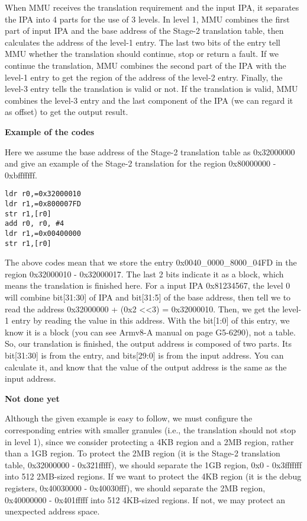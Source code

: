 When MMU receives the translation requirement and the input IPA, it separates the IPA into 4 parts for the use of 3 levels.
In level 1, MMU combines the first part of input IPA and the base address of the Stage-2 translation table, then calculates the address of the level-1 entry.
The last two bits of the entry tell MMU whether the translation should continue, stop or return a fault.
If we continue the translation, MMU combines the second part of the IPA with the level-1 entry to get the region of the address of the level-2 entry. Finally, the level-3 entry tells the translation is valid or not. If the translation is valid, MMU combines the level-3 entry and the last component of the IPA (we can regard it as offset) to get the output result. 

\vspace{10pt}
\textbf{Example of the codes}
\vspace{10pt}

Here we assume the base address of the Stage-2 translation table as 0x32000000 and give an example of the Stage-2 translation for the region 0x80000000 - 0xbfffffff.

\begin{lstlisting}
ldr r0,=0x32000010
ldr r1,=0x800007FD
str r1,[r0]
add r0,	r0,	#4
ldr r1,=0x00400000
str r1,[r0]
\end{lstlisting}

The above codes mean that we store the entry 0x0040\_0000\_8000\_04FD in the region 0x32000010 - 0x32000017.
The last 2 bits indicate it as a block, which means the translation is finished here.
For a input IPA 0x81234567, the level 0 will combine 
bit[31:30] of IPA and bit[31:5] of the base address, then tell we to read the address 0x32000000 + (0x2 \textless \textless 3) = 0x32000010. Then, we get the level-1 entry by reading the value in this address.
With the bit[1:0] of this entry, we know it is a block (you can see Armv8-A manual on page G5-6290), not a table. So, our translation is finished, the output address is composed of two parts. Its bit[31:30] is from the entry, and bits[29:0] is from the input address. You can calculate it, and know that the value of the output address is the same as the input address.

\vspace{10pt}
\textbf{Not done yet}
\vspace{10pt}

Although the given example is easy to follow, we must configure the corresponding entries with smaller granules (i.e., the translation should not stop in level 1), since we consider protecting a 4KB region and a 2MB region, rather than a 1GB region.
To protect the 2MB region (it is the Stage-2 translation table, 0x32000000 - 0x321fffff), we should separate the 1GB region, 0x0 - 0x3fffffff into 512 2MB-sized regions. If we want to protect the 4KB region (it is the debug registers, 0x40030000 - 0x40030fff), we should separate the 2MB region, 0x40000000 - 0x401fffff into 512 4KB-sized regions. If not, we may protect an unexpected address space.


